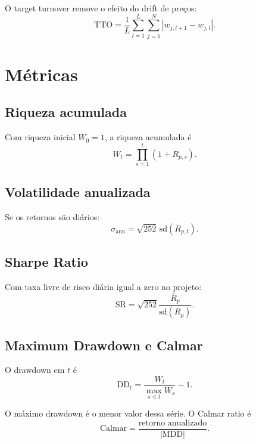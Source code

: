 \documentclass[12pt,a4paper]{article}
\begin{document}
O target turnover remove o efeito do drift de preços:
\begin{equation}
  \mathrm{TTO}
  =
  \frac{1}{L}
  \sum_{l=1}^{L}
  \sum_{j=1}^{N}
  |w_{j,l+1} - w_{j,l}|.
\end{equation}

\section{Métricas}

\subsection{Riqueza acumulada}

Com riqueza inicial $W_0=1$, a riqueza acumulada é
\begin{equation}
  W_t = \prod_{s=1}^{t}(1+R_{p,s}).
\end{equation}

\subsection{Volatilidade anualizada}

Se os retornos são diários:
\begin{equation}
  \sigma_{\mathrm{ann}}
  =
  \sqrt{252}\,\mathrm{sd}(R_{p,t}).
\end{equation}

\subsection{Sharpe Ratio}

Com taxa livre de risco diária igual a zero no projeto:
\begin{equation}
  \mathrm{SR}
  =
  \sqrt{252}
  \frac{\bar R_p}{\mathrm{sd}(R_p)}.
\end{equation}

\subsection{Maximum Drawdown e Calmar}

O drawdown em $t$ é
\begin{equation}
  \mathrm{DD}_t
  =
  \frac{W_t}{\max_{s\le t}W_s}-1.
\end{equation}

O máximo drawdown é o menor valor dessa série. O Calmar ratio é
\begin{equation}
  \mathrm{Calmar}
  =
  \frac{\text{retorno anualizado}}{|\mathrm{MDD}|}.
\end{equation}
\end{document}
